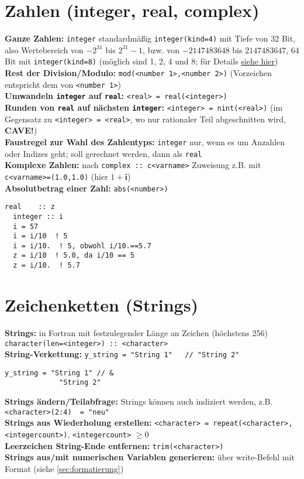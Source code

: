\documentclass[a4paper, twocolumn]{scrarticle}
\begin{document}
\section{Zahlen (integer, real, complex)}
\textbf{Ganze Zahlen:} \lstinline|integer| standardmäßig \lstinline|integer(kind=4)| mit Tiefe von 32 Bit, also Wertebereich von $-2^{31}$ bis $2^{31}-1$, bzw. von $-2147483648$ bis $2147483647$, 64 Bit mit \lstinline|integer(kind=8)| (möglich sind 1, 2, 4 und 8; für Details \href{http://earth.uni-muenster.de/~joergs/doc/f90/unix-um/dfum_034.html}{siehe hier})\\
\textbf{Rest der Division/Modulo:} \lstinline|mod(<number 1>,<number 2>)| (Vorzeichen entspricht dem von \lstinline|<number 1>|) \\
\textbf{Umwandeln \lstinline|integer| auf \lstinline|real|:} \lstinline|<real> = real(<integer>)|\\
\textbf{Runden von \lstinline|real| auf nächsten \lstinline|integer|:} \lstinline|<integer> = nint(<real>)| (im Gegensatz zu \lstinline|<integer> = <real>|, wo nur rationaler Teil abgeschnitten wird, \textbf{CAVE!})\\
\textbf{Faustregel zur Wahl des Zahlentyps:} \lstinline|integer| nur, wenn es um Anzahlen oder Indizes geht; soll gerechnet werden, dann als \lstinline|real|\\
\textbf{Komplexe Zahlen:} nach \lstinline|complex :: c<varname>| Zuweisung z.B. mit \lstinline|c<varname>=(1.0,1.0)| (hier $1+\textbf{i}$)\\
\textbf{Absolutbetrag einer Zahl:} \lstinline|abs(<number>)|
\begin{lstlisting}[caption={\bfseries Beispiel: CAVE - implizite Umwandlungen bei Division}]
  real    :: z
  integer :: i
  i = 57
  i = i/10  ! 5
  i = i/10.  ! 5, obwohl i/10.==5.7
  z = i/10  ! 5.0, da i/10 == 5
  z = i/10.  ! 5.7
\end{lstlisting}

\section{Zeichenketten (Strings)}
\textbf{Strings:} in Fortran mit festzulegender Länge an Zeichen  (höchstens 256) \lstinline|character(len=<integer>) :: <character>|\\
\textbf{String-Verkettung:} \lstinline|y_string = "String 1"   // "String 2"|
\begin{lstlisting}[caption={\bfseries Beispiel: String-Verkettung über Code-Zeilen hinweg},label=lst:stringkette]
  y_string = "String 1" // &
             "String 2"
\end{lstlisting}
\textbf{Strings ändern/Teilabfrage:} Strings können auch indiziert werden, z.B. \lstinline|<character>(2:4)  = "neu"|\\
\textbf{Strings aus Wiederholung erstellen:} \lstinline|<character> = repeat(<character>, <integercount>)|, \lstinline|<integercount>| $\geq 0$\\
\textbf{Leerzeichen String-Ende entfernen:} \lstinline|trim(<character>)| \\
\textbf{Strings aus/mit numerischen Variablen generieren:} über write-Befehl mit Format (siehe \cref{sec:formatierung})
\end{document}
